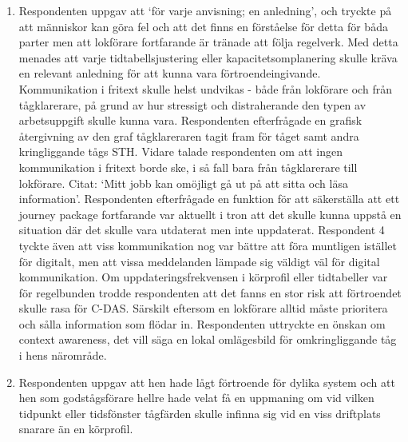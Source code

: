 \begin{enumerate}
    Hen betonade också vikten av att inte gå från ATC-vakt till C-DAS-vakt, och med detta avses att det fortfarande måste finnas något hantverk kvar i yrket.
    Respondenten uttryckte en vilja att kunna meddela när det fanns goda chanser att köra igen tid då denna information ofta var uppenbar för en lokförare men kanske inte för en tågklarerare på samma sätt.
    Vidare uttryckte respondenten att det var viktigt att systemet skulle trumfa förarens egna erfarenheter för att vara till nytta och framförallt förtroendeingivande.
    \item Respondenten uppgav att \lq{}för varje anvisning; en anledning\rq{}, och tryckte på att människor kan göra fel och att det finns en förståelse för detta för båda parter men att lokförare fortfarande är tränade att följa regelverk.
    Med detta menades att varje tidtabellsjustering eller kapacitetsomplanering skulle kräva en relevant anledning för att kunna vara förtroendeingivande.
    Kommunikation i fritext skulle helst undvikas - både från lokförare och från tågklarerare, på grund av hur stressigt och distraherande den typen av arbetsuppgift skulle kunna vara.
    Respondenten efterfrågade en grafisk återgivning av den graf tågklareraren tagit fram för tåget samt andra kringliggande tågs STH\@.
    Vidare talade respondenten om att ingen kommunikation i fritext borde ske, i så fall bara från tågklarerare till lokförare.
    Citat: \lq{}Mitt jobb kan omöjligt gå ut på att sitta och läsa information\rq{}.
    Respondenten efterfrågade en funktion för att säkerställa att ett journey package fortfarande var aktuellt i tron att det skulle kunna uppstå en situation där det skulle vara utdaterat men inte uppdaterat.
    Respondent 4 tyckte även att viss kommunikation nog var bättre att föra muntligen istället för digitalt, men att vissa meddelanden lämpade sig väldigt väl för digital kommunikation.
    Om uppdateringsfrekvensen i körprofil eller tidtabeller var för regelbunden trodde respondenten att det fanns en stor risk att förtroendet skulle rasa för C-DAS\@.
    Särskilt eftersom en lokförare alltid måste prioritera och sålla information som flödar in.
    Respondenten uttryckte en önskan om context awareness, det vill säga en lokal omlägesbild för omkringliggande tåg i hens närområde.
    \item Respondenten uppgav att hen hade lågt förtroende för dylika system och att hen som godstågsförare hellre hade velat få en uppmaning om vid vilken tidpunkt eller tidsfönster tågfärden skulle infinna sig vid en viss driftplats snarare än en körprofil.

\end{enumerate}
